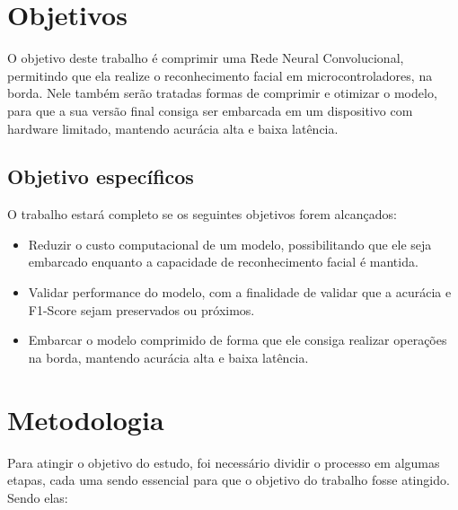 \section{Objetivos}

O objetivo deste trabalho é comprimir uma Rede Neural Convolucional, permitindo que ela realize o reconhecimento
facial em microcontroladores, na borda.
Nele também serão tratadas formas de comprimir e otimizar o modelo, para que a sua versão final consiga ser embarcada
em um dispositivo com hardware limitado, mantendo acurácia alta e baixa latência.

\subsection{Objetivo específicos}
O trabalho estará completo se os seguintes objetivos forem alcançados:

\begin{itemize}
	\item Reduzir o custo computacional de um modelo, possibilitando que ele seja embarcado enquanto a capacidade
		de reconhecimento facial é mantida.
	\item Validar performance do modelo, com a finalidade de validar que a acurácia e F1-Score sejam preservados
		ou próximos.
	\item Embarcar o modelo comprimido de forma que ele consiga realizar operações na borda, mantendo acurácia
		alta e baixa latência.
\end{itemize}

\section{Metodologia}
Para atingir o objetivo do estudo, foi necessário dividir o processo em algumas etapas, cada uma sendo
essencial para que o objetivo do trabalho fosse atingido. Sendo elas:

